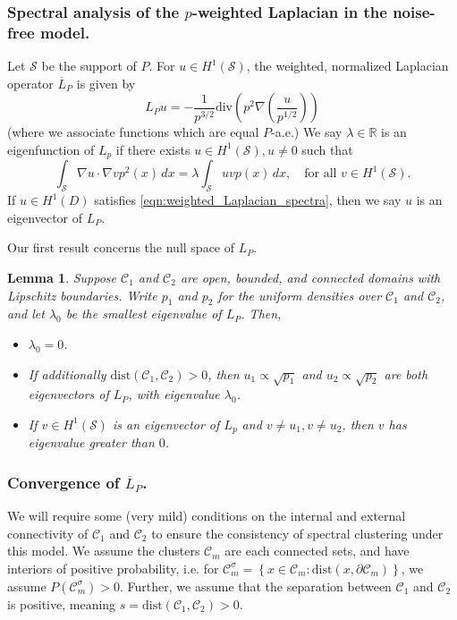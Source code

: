 \documentclass{article}
\newcommand{\Reals}{\mathbb{R}}
\newcommand{\set}[1]{\left\{#1\right\}}
\newcommand{\1}{\mathbf{1}}
\newcommand{\Cset}{\mathcal{C}}
\newcommand{\dive}{\mathrm{div}}
\newcommand{\gradient}{\nabla}
\newcommand{\dist}{\textrm{dist}}
\theoremstyle{alden}
\theoremstyle{aldenthm}
\newtheorem{lemma}{Lemma}
\theoremstyle{definition}
\theoremstyle{remark}
\begin{document}
\subsubsection{Spectral analysis of the $p$-weighted Laplacian in the noise-free model.}

Let $\mathcal{S}$ be the support of $P$. For $u \in H^1(\mathcal{S})$, the weighted, normalized Laplacian operator $\overline{L}_{P}$ is given by
\begin{equation*}
L_Pu = -\frac{1}{p^{3/2}} \dive(p^2 \gradient(\frac{u}{p^{1/2}}))
\end{equation*}
(where we associate functions which are equal $P$-a.e.) We say $\lambda \in \Reals$ is an eigenfunction of $L_p$ if there exists $u \in H^1(\mathcal{S}), u \neq 0$ such that
\begin{equation}
\label{eqn:weighted_Laplacian_spectra}
\int_{\mathcal{S}} \gradient u \cdot \gradient v p^2(x) \,dx = \lambda \int_{\mathcal{S}} u v p(x) \,dx, \quad \textrm{for all $v \in H^1(\mathcal{S})$.}
\end{equation}
If $u \in H^1(D)$ satisfies \eqref{eqn:weighted_Laplacian_spectra}, then we say $u$ is an eigenvector of $L_P$. 

Our first result concerns the null space of $L_P$. 
\begin{lemma}
	Suppose $\mathcal{C}_1$ and $\mathcal{C}_2$ are open, bounded, and connected domains with Lipschitz boundaries. Write $p_1$ and $p_2$ for the uniform densities over $\mathcal{C}_1$ and $\mathcal{C}_2$, and let $\lambda_0$ be the smallest eigenvalue of $L_P$. Then,
	\begin{itemize}
		\item $\lambda_0 = 0$.
		\item If additionally $\dist(\mathcal{C}_1, \mathcal{C}_2) > 0$, then $u_1 \propto \sqrt{p_1}$ and $u_2 \propto \sqrt{p_2}$ are both eigenvectors of $L_P$, with eigenvalue $\lambda_0$. 
		\item If $v \in H^1(\mathcal{S})$ is an eigenvector of $L_p$ and  $v \neq u_1, v \neq u_2$, then $v$ has eigenvalue greater than $0$.
	\end{itemize}
\end{lemma}

\subsubsection{Convergence of $\overline{L}_P$.}


We will require some (very mild) conditions on the internal and external connectivity of $\Cset_1$ and $\Cset_2$ to ensure the consistency of spectral clustering under this model. We assume the clusters $\Cset_m$ are each connected sets, and have interiors of positive probability, i.e. for $\Cset_m^{\sigma} = \set{x \in \Cset_m: \dist(x,\partial \Cset_m)}$, we assume $P(\Cset_m^{\sigma}) > 0$. Further, we assume that the separation between $\mathcal{C}_1$ and $\mathcal{C}_2$ is positive, meaning $s = \dist(\mathcal{C}_1,\mathcal{C}_2) > 0$. 
\end{document}
